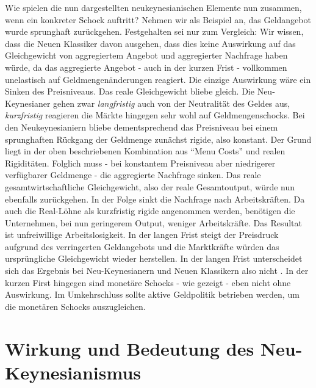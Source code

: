 Wie spielen die nun dargestellten neukeynesianischen Elemente nun zusammen, wenn ein konkreter Schock auftritt? Nehmen wir als Beispiel an, das Geldangebot wurde sprunghaft zurückgehen. Festgehalten sei nur zum Vergleich: Wir wissen, dass die Neuen Klassiker davon ausgehen, dass dies keine Auswirkung auf das Gleichgewicht von aggregiertem Angebot und aggregierter Nachfrage haben würde, da das aggregierte Angebot - auch in der kurzen Frist - vollkommen unelastisch auf Geldmengenänderungen reagiert. Die einzige Auswirkung wäre ein Sinken des Preisniveaus. Das reale Gleichgewicht bliebe gleich. Die Neu-Keynesianer gehen zwar \textit{langfristig} auch von der Neutralität des Geldes aus, \textit{kurzfristig} reagieren die Märkte hingegen sehr wohl auf Geldmengenschocks. Bei den Neukeynesianiern bliebe dementsprechend das Preisniveau bei einem sprunghaften Rückgang der Geldmenge zunächst rigide, also konstant. Der Grund liegt in der oben beschriebenen Kombination aus "`Menu Costs"' und realen Rigiditäten. Folglich muss - bei konstantem Preisniveau aber niedrigerer verfügbarer Geldmenge - die aggregierte Nachfrage sinken. Das reale gesamtwirtschaftliche Gleichgewicht, also der reale Gesamtoutput, würde nun ebenfalls zurückgehen. In der Folge sinkt die Nachfrage nach Arbeitskräften. Da auch die Real-Löhne als kurzfristig rigide angenommen werden, benötigen die Unternehmen, bei nun geringerem Output, weniger Arbeitskräfte. Das Resultat ist unfreiwillige Arbeitslosigkeit. In der langen Frist steigt der Preisdruck aufgrund des verringerten Geldangebots und die Marktkräfte würden das ursprüngliche Gleichgewicht wieder herstellen. In der langen Frist unterscheidet sich das Ergebnis bei Neu-Keynesianern und Neuen Klassikern also nicht \parencite[S. 398]{Snowdon2005}. In der kurzen First hingegen sind monetäre Schocks - wie gezeigt - eben nicht ohne Auswirkung. Im Umkehrschluss sollte aktive Geldpolitik betrieben werden, um die monetären Schocks auszugleichen.

\section{Wirkung und Bedeutung des Neu-Keynesianismus}

